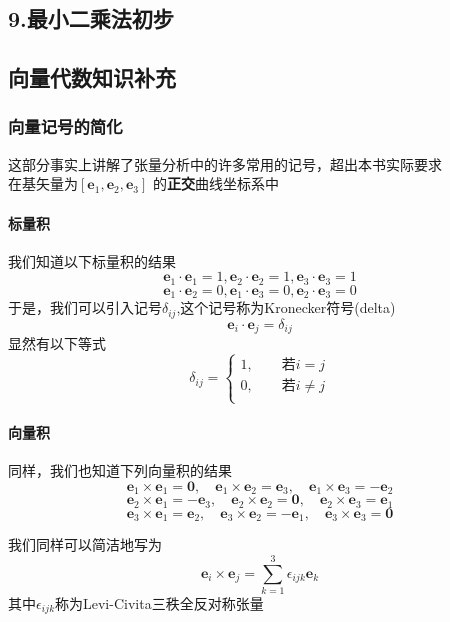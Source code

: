 \documentclass{article}
\newcommand{\ve}{\boldsymbol}
\begin{document}
\begin{CJK}{UTF8}{gkai}
\subsection*{9.最小二乘法初步}

\subsection*{向量代数知识补充}
\subsubsection*{向量记号的简化}
这部分事实上讲解了张量分析中的许多常用的记号，超出本书实际要求 \\
在基矢量为$[\ve{e}_1,\ve{e}_2,\ve{e}_3]$
的\textbf{正交}曲线坐标系中\\

\paragraph{标量积\\}
我们知道以下标量积的结果
\[\ve{e}_1\cdot\ve{e}_1=1,\ve{e}_2\cdot\ve{e}_2=1,\ve{e}_3\cdot\ve{e}_3=1\]
\[\ve{e}_1\cdot\ve{e}_2=0,\ve{e}_1\cdot\ve{e}_3=0,\ve{e}_2\cdot\ve{e}_3=0\]
于是，我们可以引入记号$\delta_{ij}$,这个记号称为Kronecker符号(delta)\\
\[\ve{e}_i\cdot\ve{e}_j=\delta_{ij}\]
显然有以下等式
\begin{equation*}
    \delta_{ij}=
    \begin{cases}
        1, \quad\quad \text{若$i  =  j$} \\
        0, \quad\quad \text{若$i\neq j$} \\
    \end{cases}
\end{equation*}

\paragraph{向量积\\}
同样，我们也知道下列向量积的结果
\[\ve{e}_1\times\ve{e}_1=\ve{0},\quad \ve{e}_1\times\ve{e}_2=\ve{e}_3,\quad \ve{e}_1\times\ve{e}_3=-\ve{e}_2\]
\[\ve{e}_2\times\ve{e}_1=-\ve{e}_3,\quad \ve{e}_2\times\ve{e}_2=\ve{0},\quad \ve{e}_2\times\ve{e}_3=\ve{e}_1\]
\[\ve{e}_3\times\ve{e}_1=\ve{e}_2,\quad \ve{e}_3\times\ve{e}_2=-\ve{e}_1,\quad \ve{e}_3\times\ve{e}_3=\ve{0}\]

我们同样可以简洁地写为
\[\ve{e}_i\times \ve{e}_j=\sum_{k=1}^3\epsilon_{ijk}\ve{e}_k\]
其中$\epsilon_{ijk}$称为Levi-Civita三秩全反对称张量\\


\end{CJK}
\end{document}
